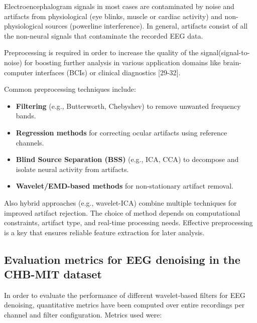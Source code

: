\documentclass{article}
\begin{document}
			Electroencephalogram signals in most cases are contaminated by noise 
			and artifacts from physiological (eye blinks, muscle or cardiac activity) 
			and non-physiological sources (powerline interference). 
			In general, artifacts consist of all the non-neural signals 
			that contaminate the recorded EEG data. 
			
			Preprocessing is required in order to increase 
			the quality of the signal(signal-to-noise)
			for boosting further analysis in various application 
			domains like brain-computer interfaces (BCIs) 
			or clinical diagnostics [29-32].
			
			Common preprocessing techniques include:  
			\begin{itemize}  
			    \item \textbf{Filtering} (e.g., Butterworth, Chebyshev) to remove unwanted frequency bands.  
			    \item \textbf{Regression methods} for correcting ocular artifacts using reference channels.  
			    \item \textbf{Blind Source Separation (BSS)} (e.g., ICA, CCA) to decompose and isolate neural activity from artifacts.  
			    \item \textbf{Wavelet/EMD-based methods} for non-stationary artifact removal.  
			\end{itemize}  
			
			Also hybrid approaches (e.g., wavelet-ICA) combine multiple techniques for improved artifact rejection. 
			The choice of method depends on computational constraints, artifact type, 
			and real-time processing needs. 
			Effective preprocessing is a key that ensures reliable feature extraction for later analysis.  

						

			\subsection{Evaluation metrics for EEG denoising in the CHB-MIT dataset}

			In order to evaluate the performance of 
			different wavelet-based filters for EEG denoising, 
			quantitative metrics have been computed over entire recordings 
			per channel and filter configuration. 
			Metrics used were:
\end{document}
